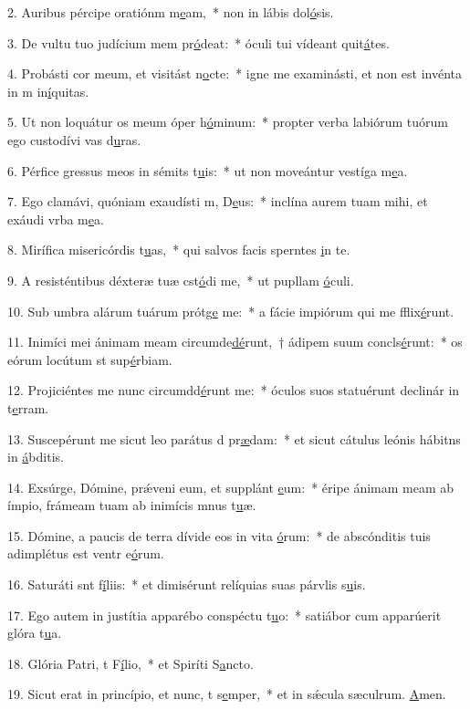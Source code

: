 2. Auribus pércipe oratiónm m\uline{e}am,~* non in lábis dol\uline{ó}sis.\par 
3. De vultu tuo judícium mem pr\uline{ó}deat:~* óculi tui vídeant quit\uline{á}tes.\par 
4. Probásti cor meum, et visitást n\uline{o}cte:~* igne me examinásti, et non est invénta in m in\uline{í}quitas.\par 
5. Ut non loquátur os meum óper h\uline{ó}minum:~* propter verba labiórum tuórum ego custodívi vas d\uline{u}ras.\par 
6. Pérfice gressus meos in sémits t\uline{u}is:~* ut non moveántur vestíga m\uline{e}a.\par 
7. Ego clamávi, quóniam exaudísti m, D\uline{e}us:~* inclína aurem tuam mihi, et exáudi vrba m\uline{e}a.\par 
8. Mirífica misericórdis t\uline{u}as,~* qui salvos facis sperntes \uline{i}n te.\par 
9. A resisténtibus déxteræ tuæ cst\uline{ó}di me,~* ut pupllam \uline{ó}culi.\par 
10. Sub umbra alárum tuárum prótg\uline{e} me:~* a fácie impiórum qui me fflix\uline{é}runt.\par 
11. Inimíci mei ánimam meam circumde\uline{dé}runt,~† ádipem suum concls\uline{é}runt:~* os eórum locútum st sup\uline{é}rbiam.\par 
12. Projiciéntes me nunc circumdd\uline{é}runt me:~* óculos suos statuérunt declinár in t\uline{e}rram.\par 
13. Suscepérunt me sicut leo parátus d pr\uline{æ}dam:~* et sicut cátulus leónis hábitns in \uline{á}bditis.\par 
14. Exsúrge, Dómine, prǽveni eum, et supplánt \uline{e}um:~* éripe ánimam meam ab ímpio, frámeam tuam ab inimícis mnus t\uline{u}æ.\par 
15. Dómine, a paucis de terra dívide eos in vita \uline{ó}rum:~* de abscónditis tuis adimplétus est ventr e\uline{ó}rum.\par 
16. Saturáti snt f\uline{í}liis:~* et dimisérunt relíquias suas párvlis s\uline{u}is.\par 
17. Ego autem in justítia apparébo conspéctu t\uline{u}o:~* satiábor cum apparúerit glóra t\uline{u}a.\par 
18. Glória Patri, t F\uline{í}lio,~* et Spiríti S\uline{a}ncto.\par 
19. Sicut erat in princípio, et nunc, t s\uline{e}mper,~* et in sǽcula sæculrum. \uline{A}men.\par 

